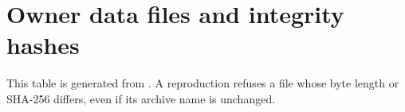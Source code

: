 \chapter{Owner data files and integrity hashes}\label{s1:ch:app04_owner_data_files_and_integrity_hashes}

This table is generated from . A reproduction refuses a file whose byte length or SHA-256 differs, even if its archive name is unchanged.

\begin{landscape}
\scriptsize
\setlength{\tabcolsep}{3pt}

\end{landscape}
